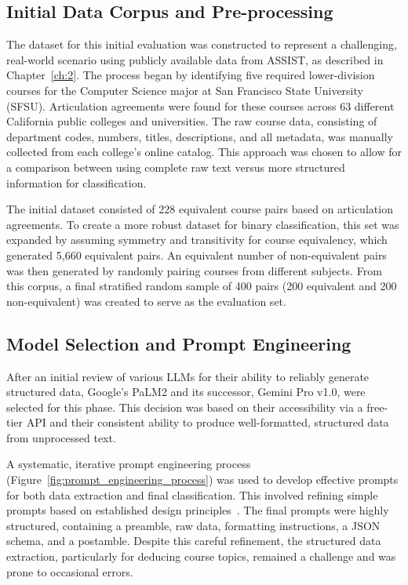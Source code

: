 \subsection{Initial Data Corpus and Pre-processing}\label{ch:3.1.1}
The dataset for this initial evaluation was constructed to represent a challenging, real-world scenario using publicly available data from ASSIST, as described in Chapter~\ref{ch:2}. The process began by identifying five required lower-division courses for the Computer Science major at San Francisco State University (SFSU). Articulation agreements were found for these courses across 63 different California public colleges and universities. The raw course data, consisting of department codes, numbers, titles, descriptions, and all metadata, was manually collected from each college's online catalog. This approach was chosen to allow for a comparison between using complete raw text versus more structured information for classification.

The initial dataset consisted of 228 equivalent course pairs based on articulation agreements. To create a more robust dataset for binary classification, this set was expanded by assuming symmetry and transitivity for course equivalency, which generated 5,660 equivalent pairs. An equivalent number of non-equivalent pairs was then generated by randomly pairing courses from different subjects. From this corpus, a final stratified random sample of 400 pairs (200 equivalent and 200 non-equivalent) was created to serve as the evaluation set.

\subsection{Model Selection and Prompt Engineering}\label{ch:3.1.2}
After an initial review of various LLMs for their ability to reliably generate structured data, Google's PaLM2 and its successor, Gemini Pro v1.0, were selected for this phase. This decision was based on their accessibility via a free-tier API and their consistent ability to produce well-formatted, structured data from unprocessed text.

A systematic, iterative prompt engineering process (Figure~\ref{fig:prompt_engineering_process}) was used to develop effective prompts for both data extraction and final classification. This involved refining simple prompts based on established design principles~\cite{ye2024promptengineeringpromptengineer,ppp,peg}. The final prompts were highly structured, containing a preamble, raw data, formatting instructions, a JSON schema, and a postamble. Despite this careful refinement, the structured data extraction, particularly for deducing course topics, remained a challenge and was prone to occasional errors.

